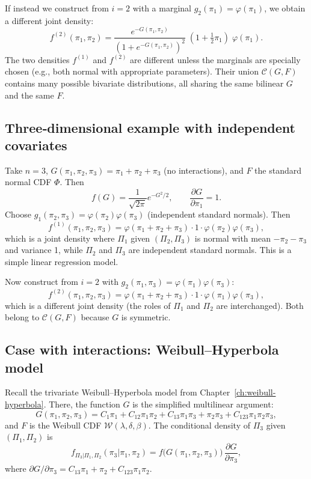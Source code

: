 If instead we construct from \(i=2\) with a marginal \(g_2(\pi_1)=\varphi(\pi_1)\), we obtain a different joint density:
\[
f^{(2)}(\pi_1,\pi_2) = \frac{e^{-G(\pi_1,\pi_2)}}{(1+e^{-G(\pi_1,\pi_2)})^2}\; (1+\tfrac12\pi_1)\; \varphi(\pi_1).
\]
The two densities \(f^{(1)}\) and \(f^{(2)}\) are different unless the marginals are specially chosen (e.g., both normal with appropriate parameters). Their union \(\mathcal{C}(G,F)\) contains many possible bivariate distributions, all sharing the same bilinear \(G\) and the same \(F\).

\subsection{Three‑dimensional example with independent covariates}

Take \(n=3\), \(G(\pi_1,\pi_2,\pi_3) = \pi_1 + \pi_2 + \pi_3\) (no interactions), and \(F\) the standard normal CDF \(\Phi\). Then
\[
f(G) = \frac{1}{\sqrt{2\pi}} e^{-G^2/2},\qquad \frac{\partial G}{\partial\pi_1}=1.
\]
Choose \(g_1(\pi_2,\pi_3) = \varphi(\pi_2)\varphi(\pi_3)\) (independent standard normals). Then
\[
f^{(1)}(\pi_1,\pi_2,\pi_3) = \varphi(\pi_1+\pi_2+\pi_3)\cdot 1 \cdot \varphi(\pi_2)\varphi(\pi_3),
\]
which is a joint density where \(\Pi_1\) given \((\Pi_2,\Pi_3)\) is normal with mean \(-\pi_2-\pi_3\) and variance 1, while \(\Pi_2\) and \(\Pi_3\) are independent standard normals. This is a simple linear regression model.

Now construct from \(i=2\) with \(g_2(\pi_1,\pi_3)=\varphi(\pi_1)\varphi(\pi_3)\):
\[
f^{(2)}(\pi_1,\pi_2,\pi_3) = \varphi(\pi_1+\pi_2+\pi_3)\cdot 1 \cdot \varphi(\pi_1)\varphi(\pi_3),
\]
which is a different joint density (the roles of \(\Pi_1\) and \(\Pi_2\) are interchanged). Both belong to \(\mathcal{C}(G,F)\) because \(G\) is symmetric.

\subsection{Case with interactions: Weibull–Hyperbola model}

Recall the trivariate Weibull–Hyperbola model from Chapter~\ref{ch:weibull-hyperbola}. There, the function \(G\) is the simplified multilinear argument:
\[
G(\pi_1,\pi_2,\pi_3) = C_1\pi_1 + C_{12}\pi_1\pi_2 + C_{13}\pi_1\pi_3 + \pi_2\pi_3 + C_{123}\pi_1\pi_2\pi_3,
\]
and \(F\) is the Weibull CDF \(\mathcal{W}(\lambda,\delta,\beta)\). The conditional density of \(\Pi_3\) given \((\Pi_1,\Pi_2)\) is
\[
f_{\Pi_3|\Pi_1,\Pi_2}(\pi_3|\pi_1,\pi_2) = f\bigl(G(\pi_1,\pi_2,\pi_3)\bigr)\,\frac{\partial G}{\partial\pi_3},
\]
where \(\partial G/\partial\pi_3 = C_{13}\pi_1 + \pi_2 + C_{123}\pi_1\pi_2\).

